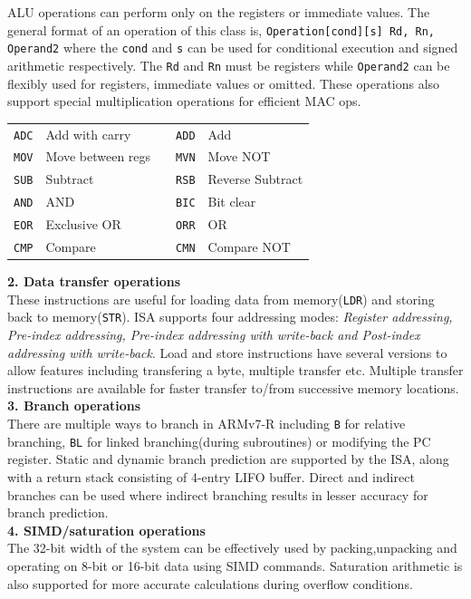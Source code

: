 \documentclass[a4paper,11pt]{article}
\begin{document}
ALU operations can perform only on the registers or immediate values. The general format of an operation of this class is, {\tt Operation[cond][s] Rd, Rn, Operand2} where the {\tt cond} and {\tt s} can be used for conditional execution and signed arithmetic respectively. The {\tt Rd} and {\tt Rn} must be registers while {\tt Operand2} can be flexibly used for registers, immediate values or omitted. These operations also support special multiplication operations for efficient MAC ops.
\begin{center}
	\begin{tabular}{l l c l l}
{\tt ADC} & Add with carry & & {\tt ADD} & Add\\
{\tt MOV} & Move between regs & & {\tt MVN} & Move NOT\\
{\tt SUB} & Subtract & & {\tt RSB} & Reverse Subtract\\
{\tt AND} & AND & & {\tt BIC} & Bit clear\\
{\tt EOR} & Exclusive OR & & {\tt ORR} & OR\\
{\tt CMP} & Compare & & {\tt CMN} & Compare NOT\\
\end{tabular}
\end{center}

\textbf{2. Data transfer operations}\\

These instructions are useful for loading data from memory({\tt LDR}) and storing back to memory({\tt STR}). ISA supports four addressing modes: \textit{Register addressing, Pre-index addressing, Pre-index addressing with write-back and Post-index addressing with write-back}. Load and store instructions have several versions to allow features including transfering a byte, multiple transfer etc. Multiple transfer instructions are available for faster transfer to/from successive memory locations.\\

\textbf{3. Branch operations}\\
There are multiple ways to branch in ARMv7-R including {\tt B} for relative branching, {\tt BL} for linked branching(during subroutines) or modifying the PC register. Static and dynamic branch prediction are supported by the ISA, along with a return stack consisting of 4-entry LIFO buffer. Direct and indirect branches can be used where indirect branching results in lesser accuracy for branch prediction.\\

\textbf{4. SIMD/saturation operations}\\
The 32-bit width of the system can be effectively used by packing,unpacking and operating on 8-bit or 16-bit data using SIMD commands. Saturation arithmetic is also supported for more accurate calculations during overflow conditions.\\
\end{document}
